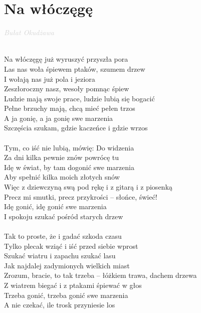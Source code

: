\documentclass[a5paper, 10pt]{book}
\begin{document}
\newpage
\section{Na włóczęgę}\textcolor{lightgray}{\textit{Bułat Okudżawa}}\\~\\
\begin{minipage}[t]{0.82\textwidth}
Na włóczęgę już wyruszyć przyszła pora\\
Las nas woła śpiewem ptaków, szumem drzew\\
I wołają nas już pola i jeziora\\
Zeszłoroczny nasz, wesoły pomnąc śpiew\\
\hspace*{5mm}Ludzie mają swoje prace, ludzie lubią się bogacić\\
\hspace*{5mm}Pełne brzuchy mają, chcą mieć pełen trzos\\
A ja gonię, a ja gonię swe marzenia\\
Szczęścia szukam, gdzie kaczeńce i gdzie wrzos\\
\\
Tym, co iść nie lubią, mówię: Do widzenia\\
Za dni kilka pewnie znów powrócę tu\\
Idę w świat, by tam dogonić swe marzenia\\
Aby spełnić kilka moich złotych snów\\
\hspace*{5mm}Więc z dziewczyną swą pod rękę i z gitarą i z piosenką\\
\hspace*{5mm}Precz mi smutki, precz przykrości – słońce, świeć!\\
Idę gonić, idę gonić swe marzenia\\
I spokoju szukać pośród starych drzew\\
\\
Tak to proste, że i gadać szkoda czasu\\
Tylko plecak wziąć i iść przed siebie wprost\\
Szukać wiatru i zapachu szukać lasu\\
Jak najdalej zadymionych wielkich miast\\
\hspace*{5mm}Zrozum, bracie, to tak trzeba – łóżkiem trawa, dachem drzewa\\
\hspace*{5mm}Z wiatrem biegać i z ptakami śpiewać w głos\\
Trzeba gonić, trzeba gonić swe marzenia\\
A nie czekać, ile trosk przyniesie los\\
\\

\end{minipage}
\end{document}
